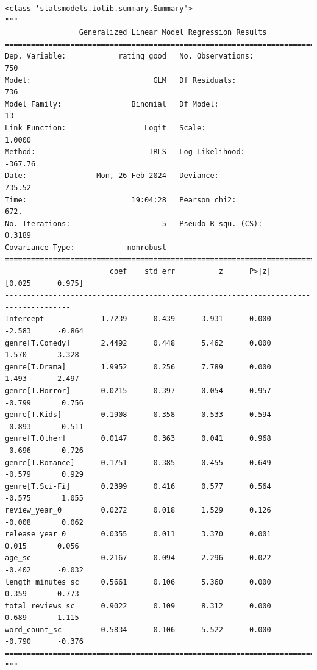 \documentclass[
  letterpaper,
]{krantz}
\begin{document}
\begin{verbatim}
<class 'statsmodels.iolib.summary.Summary'>
"""
                 Generalized Linear Model Regression Results                  
==============================================================================
Dep. Variable:            rating_good   No. Observations:                  750
Model:                            GLM   Df Residuals:                      736
Model Family:                Binomial   Df Model:                           13
Link Function:                  Logit   Scale:                          1.0000
Method:                          IRLS   Log-Likelihood:                -367.76
Date:                Mon, 26 Feb 2024   Deviance:                       735.52
Time:                        19:04:28   Pearson chi2:                     672.
No. Iterations:                     5   Pseudo R-squ. (CS):             0.3189
Covariance Type:            nonrobust                                         
=====================================================================================
                        coef    std err          z      P>|z|      [0.025      0.975]
-------------------------------------------------------------------------------------
Intercept            -1.7239      0.439     -3.931      0.000      -2.583      -0.864
genre[T.Comedy]       2.4492      0.448      5.462      0.000       1.570       3.328
genre[T.Drama]        1.9952      0.256      7.789      0.000       1.493       2.497
genre[T.Horror]      -0.0215      0.397     -0.054      0.957      -0.799       0.756
genre[T.Kids]        -0.1908      0.358     -0.533      0.594      -0.893       0.511
genre[T.Other]        0.0147      0.363      0.041      0.968      -0.696       0.726
genre[T.Romance]      0.1751      0.385      0.455      0.649      -0.579       0.929
genre[T.Sci-Fi]       0.2399      0.416      0.577      0.564      -0.575       1.055
review_year_0         0.0272      0.018      1.529      0.126      -0.008       0.062
release_year_0        0.0355      0.011      3.370      0.001       0.015       0.056
age_sc               -0.2167      0.094     -2.296      0.022      -0.402      -0.032
length_minutes_sc     0.5661      0.106      5.360      0.000       0.359       0.773
total_reviews_sc      0.9022      0.109      8.312      0.000       0.689       1.115
word_count_sc        -0.5834      0.106     -5.522      0.000      -0.790      -0.376
=====================================================================================
"""
\end{verbatim}
\end{document}

